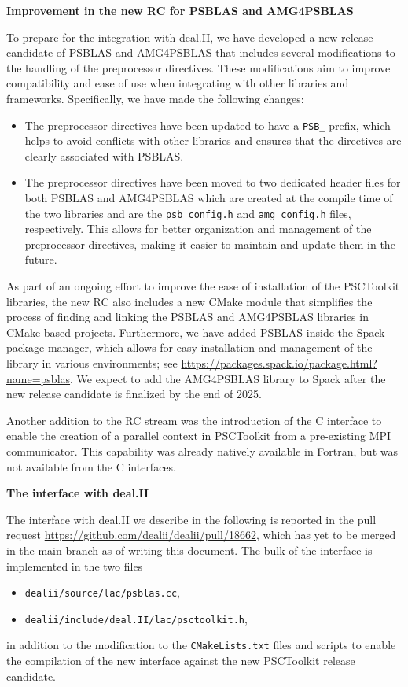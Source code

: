 \documentclass[a4paper,12pt, numbers]{article}
\begin{document}
\noindent\textbf{Improvement in the new RC for PSBLAS and AMG4PSBLAS}

To prepare for the integration with deal.II, we have developed a new release candidate of PSBLAS and AMG4PSBLAS
that includes several modifications to the handling of the preprocessor directives. These modifications aim
to improve compatibility and ease of use when integrating with other libraries and frameworks.
Specifically, we have made the following changes:
\begin{itemize}
\item The preprocessor directives have been updated to have a \verb|PSB_| prefix, which helps to
avoid conflicts with other libraries and ensures that the directives are clearly associated with PSBLAS.
\item The preprocessor directives have been moved to two dedicated header files for both PSBLAS and AMG4PSBLAS
which are created at the compile time of the two libraries and are the \verb|psb_config.h| and
\verb|amg_config.h| files, respectively. This allows for better organization and management of the
preprocessor directives, making it easier to maintain and update them in the future.
\end{itemize}

As part of an ongoing effort to improve the ease of installation of the PSCToolkit libraries, the new RC also
includes a new CMake module that simplifies the process of finding and linking the PSBLAS and AMG4PSBLAS libraries
in CMake-based projects. Furthermore, we have added PSBLAS inside the Spack package manager, which allows for
easy installation and management of the library in various environments; see \url{https://packages.spack.io/package.html?name=psblas}.
We expect to add the AMG4PSBLAS library to Spack after the new release candidate is finalized by the end of 2025.

Another addition to the RC stream was the introduction of the C interface to enable the creation of a parallel context
in PSCToolkit from a pre-existing MPI communicator. This capability was already natively available in Fortran,
but was not available from the C interfaces.


\noindent\textbf{The interface with deal.II}

The interface with deal.II we describe in the following is reported in the pull request
\url{https://github.com/dealii/dealii/pull/18662}, which has yet to be merged in the main branch as of writing this document.
The bulk of the interface is implemented in the two files
\begin{itemize}
\item \texttt{dealii/source/lac/psblas.cc},
\item \texttt{dealii/include/deal.II/lac/psctoolkit.h},
\end{itemize}
in addition to the modification to the \texttt{CMakeLists.txt} files and scripts to enable the
compilation of the new interface against the new PSCToolkit release candidate.
\end{document}
